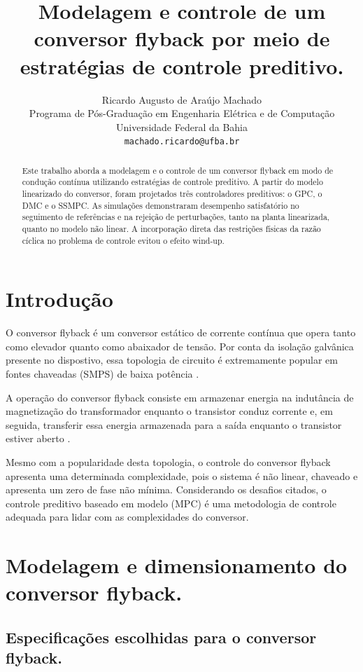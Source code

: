 \documentclass{article}
\title{Modelagem e controle de um conversor flyback por meio de estratégias de controle preditivo.}
\author{
 Ricardo Augusto de Araújo Machado \\
  Programa de Pós-Graduação em Engenharia Elétrica e de Computação\\
  Universidade Federal da Bahia\\
  \texttt{machado.ricardo@ufba.br} \\
}
\begin{document}
\maketitle
\begin{abstract}
 Este trabalho aborda a modelagem e o controle de um conversor flyback em modo de condução contínua utilizando estratégias de controle preditivo. A partir do modelo linearizado do conversor, foram projetados três controladores preditivos: o GPC, o DMC e o SSMPC. As simulações demonstraram desempenho satisfatório no seguimento de referências e na rejeição de perturbações, tanto na planta linearizada, quanto no modelo não linear. A incorporação direta das restrições físicas da razão cíclica no problema de controle evitou o efeito wind-up.
\end{abstract}




\section{Introdução}
O conversor flyback é um conversor estático de corrente contínua que opera tanto como elevador quanto como abaixador de tensão. Por conta da isolação galvânica presente no dispostivo, essa topologia de circuito é extremamente popular em fontes chaveadas (SMPS) de baixa potência \cite{Picard2010}.

A operação do conversor flyback consiste em armazenar energia na indutância de magnetização do transformador enquanto o transistor conduz corrente e, em seguida, transferir essa energia armazenada para a saída enquanto o transistor estiver aberto \cite{Picard2010}.

Mesmo com a popularidade desta topologia, o controle do conversor flyback apresenta uma determinada complexidade, pois o sistema é não linear, chaveado e apresenta um zero de fase não mínima. Considerando os desafios citados, o controle preditivo baseado em modelo (MPC) é uma metodologia de controle adequada para lidar com as complexidades do conversor.


\section{Modelagem e dimensionamento do conversor flyback.}

\subsection{Especificações escolhidas para o conversor flyback.}
\end{document}
